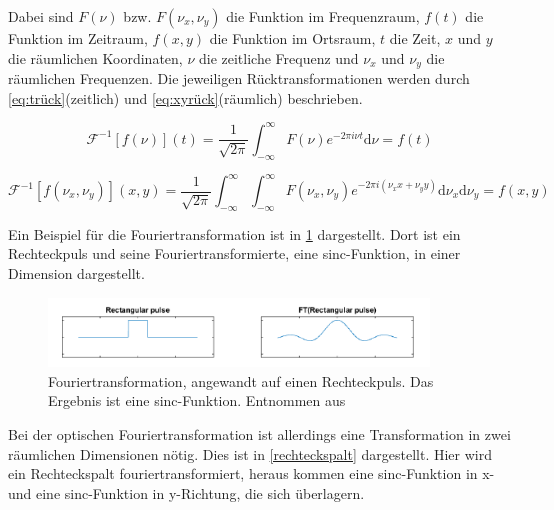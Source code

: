 Dabei sind $F\left( \nu\right)$ bzw. $F\left( \nu_x, \nu_y\right)$ die Funktion im Frequenzraum, $f\left( t\right)$ die Funktion im Zeitraum, $f\left( x,y\right)$ die Funktion im Ortsraum, $t$ die Zeit, $x$ und $y$ die räumlichen Koordinaten, $\nu$ die zeitliche Frequenz und $\nu_x$ und $\nu_y$ die räumlichen Frequenzen. Die jeweiligen Rücktransformationen werden durch \cref{eq:trück}(zeitlich) und \cref{eq:xyrück}(räumlich) beschrieben.

\begin{equation}
	\mathcal{F}^{-1}\left[ f\left( \nu\right) \right] \left( t\right) = \frac{1}{\sqrt{2\pi}} \int_{-\infty}^{\infty} F\left( \nu\right) e^{-2\pi i \nu t} \text{d}\nu = f\left( t\right) 
	\label{eq:trück}
\end{equation}

\begin{equation}
	\mathcal{F}^{-1}\left[ f\left( \nu_x,\nu_y\right) \right] \left( x, y\right) = \frac{1}{\sqrt{2\pi}} \int_{-\infty}^{\infty} \int_{-\infty}^{\infty} F\left( \nu_x,\nu_y\right) e^{-2\pi i (\nu_x x + \nu_y y)} \text{d}\nu_x \text{d}\nu_y = f\left( x, y\right) 
	\label{eq:xyrück}
\end{equation}

Ein Beispiel für die Fouriertransformation ist in \cref{rechteckpuls} dargestellt. Dort ist ein Rechteckpuls und seine Fouriertransformierte, eine sinc-Funktion, in einer Dimension dargestellt. 

\begin{figure}[h!]
	\centering
	\includegraphics[width=0.9\textwidth]{rechteckpuls.png}
	\caption{Fouriertransformation, angewandt auf einen Rechteckpuls. Das Ergebnis ist eine sinc-Funktion. Entnommen aus \cite[3]{anleitung-ws2014}}
	\label{rechteckpuls}
\end{figure}

Bei der optischen Fouriertransformation ist allerdings eine Transformation in zwei räumlichen Dimensionen nötig. Dies ist in \cref{rechteckspalt} dargestellt. Hier wird ein Rechteckspalt fouriertransformiert, heraus kommen eine sinc-Funktion in x- und eine sinc-Funktion in y-Richtung, die sich überlagern.

